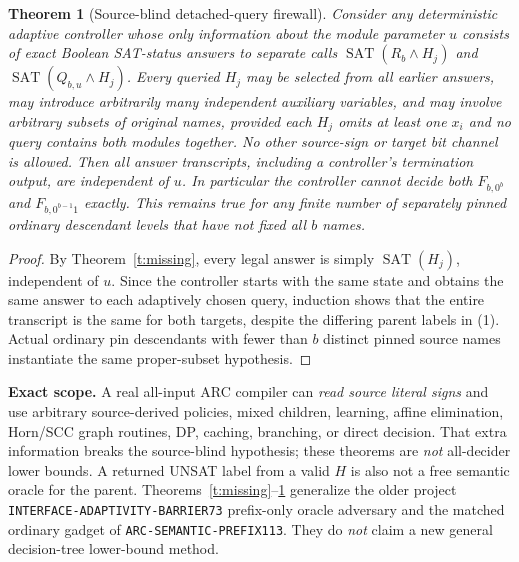 \documentclass[11pt]{article}
\newtheorem{theorem}{Theorem}
\newcommand{\SAT}{\operatorname{SAT}}
\begin{document}
\begin{theorem}[Source-blind detached-query firewall]\label{t:detached}
Consider any deterministic adaptive controller whose \emph{only}
information about the module parameter $u$ consists of exact Boolean
SAT-status answers to separate calls
$\SAT(R_b\wedge H_j)$ and $\SAT(Q_{b,u}\wedge H_j)$.
Every queried $H_j$ may be selected from all earlier answers, may
introduce arbitrarily many independent auxiliary variables, and
may involve arbitrary subsets of original names, \emph{provided
each} $H_j$ omits at least one $x_i$ and no query contains
both modules together. No other source-sign or target bit channel
is allowed. Then all answer transcripts, including a controller's
termination output, are independent of $u$.
In particular the controller cannot decide both
$F_{b,0^b}$ and $F_{b,0^{b-1}1}$ exactly.
This remains true for any finite number of separately pinned
ordinary descendant levels that have not fixed all $b$ names.
\end{theorem}
\begin{proof}
By Theorem~\ref{t:missing}, every legal answer is simply
$\SAT(H_j)$, independent of $u$. Since the controller starts with
the same state and obtains the same answer to each adaptively chosen
query, induction shows that the entire transcript is the same for
both targets, despite the differing parent labels in (1).
Actual ordinary pin descendants with fewer than $b$ distinct pinned
source names instantiate the same proper-subset hypothesis.
\end{proof}
\noindent
\textbf{Exact scope.}
A real all-input ARC compiler can \emph{read source literal signs}
and use arbitrary source-derived policies, mixed children, learning,
affine elimination, Horn/SCC graph routines, DP, caching, branching,
or direct decision. That extra information breaks the source-blind
hypothesis; these theorems are \emph{not} all-decider lower bounds.
A returned UNSAT label from a valid $H$ is also not a free semantic
oracle for the parent. Theorems~\ref{t:missing}--\ref{t:detached}
generalize the older project
\texttt{INTERFACE-ADAPTIVITY-BARRIER73} prefix-only
oracle adversary and the matched ordinary gadget of
\texttt{ARC-SEMANTIC-PREFIX113}. They do \emph{not}
claim a new general decision-tree lower-bound method.
\end{document}
